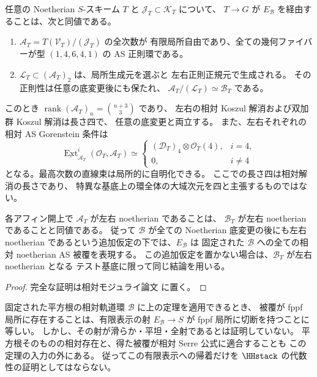 \begin{theorem}[二次被覆の相対有限判定]
任意の Noetherian $S$-スキーム $T$ と
$\mathcal J_T\subset\mathcal K_T$ について、
$T\to G$ が $E_{\mathcal B}$ を経由することは、次と同値である。
\begin{enumerate}[label=(\alph*)]
\item $\mathcal A_T=T(\mathcal V_T)/(\mathcal J_T)$ の全次数が
有限局所自由であり、全ての幾何ファイバーが型 $(1,4,6,4,1)$ の
AS 正則環である。
\item $\mathcal L_T\subset(\mathcal A_T)_2$ は、局所生成元を選ぶと
左右正則正規元で生成される。
その正則性は任意の底変更後にも保たれ、
$\mathcal A_T/(\mathcal L_T)\simeq\mathcal B_T$ である。
\end{enumerate}
このとき $\operatorname{rank}(\mathcal A_T)_n=\binom{n+3}{3}$ であり、
左右の相対 Koszul 解消および双加群 Koszul 解消は長さ四で、
任意の底変更と両立する。
また、左右それぞれの相対 AS Gorenstein 条件は
\[
 \underline{\operatorname{Ext}}_{\mathcal A_T}^i
       (\mathcal O_T,\mathcal A_T)
 \simeq
 \begin{cases}
  (\mathcal D_T)_4\otimes\mathcal O_T(4),&i=4,\\
  0,&i\ne4
 \end{cases}
\]
となる。最高次数の直線束は局所的に自明化できる。
ここでの長さ四は相対解消の長さであり、
特異な基底上の環全体の大域次元を四と主張するものではない。

各アフィン開上で $\mathcal A_T$ が左右 noetherian であることは、
$\mathcal B_T$ が左右 noetherian であることと同値である。
従って $\mathcal B$ が全ての Noetherian 底変更の後にも左右 noetherian
であるという追加仮定の下では、$E_{\mathcal B}$ は
固定された $\mathcal B$ への全ての相対 noetherian AS 被覆を表現する。
この追加仮定を置かない場合は、$\mathcal B_T$ が左右 noetherian となる
テスト基底に限って同じ結論を用いる。
\end{theorem}
\begin{proof}
完全な証明は相対モジュライ論文 \cite[相対 AS 被覆の有限判定と fppf 像の反例]{QuadricModuli2026} に置く。
\end{proof}

\begin{remark}[相対被覆の存在として残る問題]
固定された平方根の相対軌道環 $\mathcal B$ に上の定理を適用できるとき、
被覆が fppf 局所に存在することは、有限表示の射
$E_{\mathcal B}\to S$ が fppf 局所に切断を持つことに等しい。
しかし、その射が滑らか・平坦・全射であるとは証明していない。
平方根そのものの相対存在と、得た被覆が相対 Serre 公式に適合することも
この定理の入力の外にある。
従ってこの有限表示への帰着だけを $\HHstack$ の代数性の証明としてはならない。
\end{remark}

